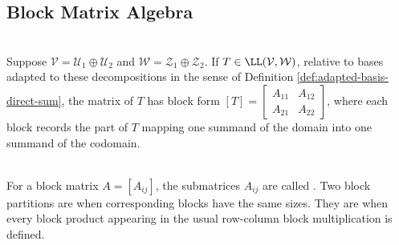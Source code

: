 \subsection{Block Matrix Algebra}
\begin{definition} \\
Suppose $\mathcal{V} = \mathcal{U}_1 \oplus \mathcal{U}_2$ and $\mathcal{W} = \mathcal{Z}_1 \oplus \mathcal{Z}_2$. If $T \in \LL(\mathcal{V}, \mathcal{W})$, relative to bases adapted to these decompositions in the sense of Definition \ref{def:adapted-basis-direct-sum}, the matrix of $T$ has block form $[T] =
\begin{bmatrix}
A_{11} & A_{12} \\
A_{21} & A_{22}
\end{bmatrix}$,
where each block records the part of $T$ mapping one summand of the domain into one summand of the codomain.
\end{definition}

\begin{definition} \\
For a block matrix $A=[A_{ij}]$, the submatrices $A_{ij}$ are called . Two block partitions are  when corresponding blocks have the same sizes. They are  when every block product appearing in the usual row-column block multiplication is defined.
\end{definition}

